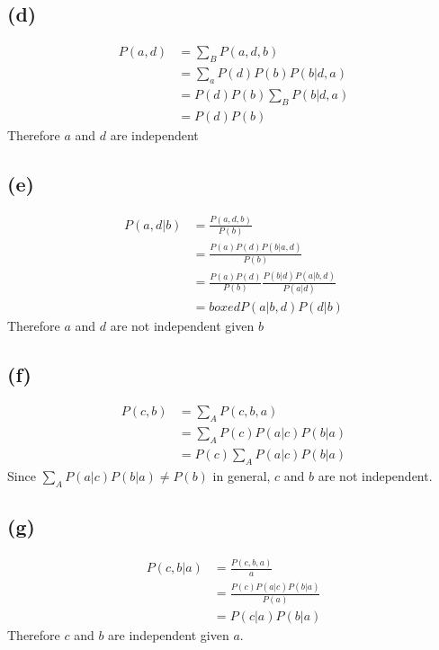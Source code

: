 \documentclass[12pt]{article}
\begin{document}
\subsection*{(d)}
\begin{align*}
   P(a,d)&= \sum_{B}P(a,d,b)\\
   &=\sum_{a}P(d)P(b)P(b|d,a)\\
   &=P(d)P(b)\sum_{B}P(b|d,a)\\
   &=P(d)P(b)
\end{align*}
Therefore $a$ and $d$ are independent
\subsection*{(e)}
\begin{align*}
    P(a,d|b)&= \frac{P(a,d,b)}{P(b)}\\
    &=\frac{P(a)P(d)P(b|a,d)}{P(b)}\\
    &=\frac{P(a)P(d)}{P(b)}\frac{P(b|d)P(a|b,d)}{P(a|d)}\\
    &=boxed{P(a|b,d)P(d|b)}
 \end{align*}
 Therefore $a$ and $d$ are not independent given $b$
 \subsection*{(f)}
 \begin{align*}
    P(c,b)&=  \sum_{A}P(c,b,a)\\
    &=\sum_{A}P(c)P(a|c)P(b|a)\\
    &=P(c)\sum_{A}P(a|c)P(b|a)
 \end{align*}
 Since $\sum_{A}P(a|c)P(b|a)\neq P(b)$ in general, $c$ and $b$ are not independent.
 \subsection*{(g)}
 \begin{align*}
    P(c,b|a)&=  \frac{P(c,b,a)}{a}\\
    &=\frac{P(c)P(a|c)P(b|a)}{P(a)}\\
    &=P(c|a)P(b|a)
 \end{align*}
 Therefore $c$ and $b$ are independent given $a$.
\end{document}
